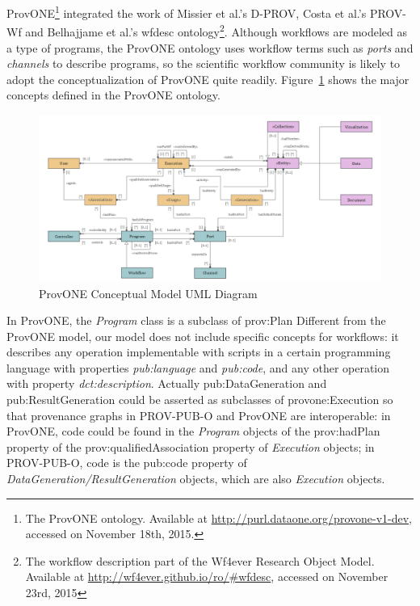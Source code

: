ProvONE\footnote{The ProvONE ontology. Available at \url{http://purl.dataone.org/provone-v1-dev}, accessed on November 18th, 2015.} integrated the work of Missier et al.'s D-PROV, Costa et al.'s PROV-Wf and Belhajjame et al.'s wfdesc ontology\footnote{The workflow description part of the Wf4ever Research Object Model. Available at \url{http://wf4ever.github.io/ro/#wfdesc}, accessed on November 23rd, 2015}. Although workflows are modeled as a type of programs, the ProvONE ontology uses workflow terms such as \emph{ports} and \emph{channels} to describe programs, so the scientific workflow community is likely to adopt the conceptualization of ProvONE quite readily. Figure~\ref{fig:provone} shows the major concepts defined in the ProvONE ontology.
\begin{figure}
	\centering
	\includegraphics[width=\textwidth]{provone.png}
	\caption{ProvONE Conceptual Model UML Diagram}
	\label{fig:provone}
\end{figure}
In ProvONE, the \emph{Program} class is a subclass of prov:Plan
Different from the ProvONE model, our model does not include specific concepts for workflows: it describes any operation implementable with scripts in a certain programming language with properties \emph{pub:language} and \emph{pub:code}, and any other operation with property \emph{dct:description}. Actually pub:DataGeneration and pub:ResultGeneration could be asserted as subclasses of provone:Execution so that provenance graphs in PROV-PUB-O and ProvONE are interoperable: in ProvONE, code could be found in the \emph{Program} objects of the prov:hadPlan property of the prov:qualifiedAssociation property of \emph{Execution} objects; in PROV-PUB-O, code is the pub:code property of \emph{DataGeneration/ResultGeneration} objects, which are also \emph{Execution} objects. 


